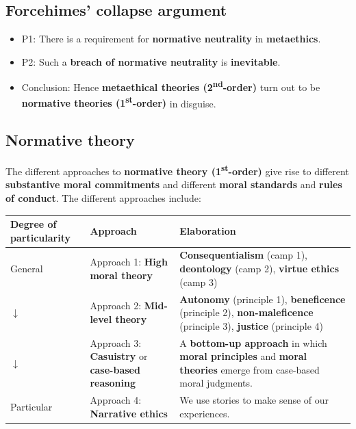 \documentclass[11pt]{article}
\begin{document}
\subsection{Forcehimes' collapse argument}
\label{sec:org7c87ec1}
\begin{itemize}
\item P1: There is a requirement for \textbf{normative neutrality} in \textbf{metaethics}.
\item P2: Such a \textbf{breach of normative neutrality} is \textbf{inevitable}.
\item Conclusion: Hence \textbf{metaethical theories (2\textsuperscript{nd}-order)} turn out to be \textbf{normative theories (1\textsuperscript{st}-order)} in disguise.
\end{itemize}
\subsection{Normative theory}
\label{sec:org222d100}
The different approaches to \textbf{normative theory (1\textsuperscript{st}-order)} give rise to different \textbf{substantive moral commitments} and different \textbf{moral standards} and \textbf{rules of conduct}. The different approaches include:

\begin{center}
\begin{tabularx}{\textwidth}{|X|X|X|}
\hline
Degree of particularity & Approach & Elaboration\\
\hline
General & Approach 1: \textbf{High moral theory} & \textbf{Consequentialism} (camp 1), \textbf{deontology} (camp 2), \textbf{virtue ethics} (camp 3)\\
\hline
\(\downarrow\) & Approach 2: \textbf{Mid-level theory} & \textbf{Autonomy} (principle 1), \textbf{beneficence} (principle 2), \textbf{non-maleficence} (principle 3), \textbf{justice} (principle 4)\\
\hline
\(\downarrow\) & Approach 3: \textbf{Casuistry} or \textbf{case-based reasoning} & A \textbf{bottom-up approach} in which \textbf{moral principles} and \textbf{moral theories} emerge from case-based moral judgments.\\
\hline
Particular & Approach 4: \textbf{Narrative ethics} & We use stories to make sense of our experiences.\\
\hline
\end{tabularx}
\end{center}
 \newpage
\end{document}

